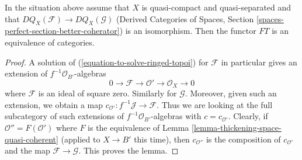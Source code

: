 \begin{lemma}
\label{lemma-thickening-over-thickening-space-quasi-coherent}
In the situation above assume that $X$ is quasi-compact and quasi-separated
and that $DQ_X(\mathcal{F}) \to DQ_X(\mathcal{G})$
(Derived Categories of Spaces, Section
\ref{spaces-perfect-section-better-coherator})
is an isomorphism. Then the functor $FT$ is an equivalence of categories.
\end{lemma}

\begin{proof}
A solution of (\ref{equation-to-solve-ringed-topoi}) for $\mathcal{F}$
in particular gives an extension of $f^{-1}\mathcal{O}_{B'}$-algebras
$$
0 \to \mathcal{F} \to \mathcal{O}' \to \mathcal{O}_X \to 0
$$
where $\mathcal{F}$ is an ideal of square zero. Similarly for $\mathcal{G}$.
Moreover, given such an extension, we obtain a map
$c_{\mathcal{O}'} : f^{-1}\mathcal{J} \to \mathcal{F}$.
Thus we are looking at the full subcategory of such extensions
of $f^{-1}\mathcal{O}_{B'}$-algebras with $c = c_{\mathcal{O}'}$.
Clearly, if $\mathcal{O}'' = F(\mathcal{O}')$ where
$F$ is the equivalence of Lemma \ref{lemma-thickening-space-quasi-coherent}
(applied to $X \to B'$ this time),
then $c_{\mathcal{O}''}$ is the composition of
$c_{\mathcal{O}'}$ and the map $\mathcal{F} \to \mathcal{G}$.
This proves the lemma.
\end{proof}










